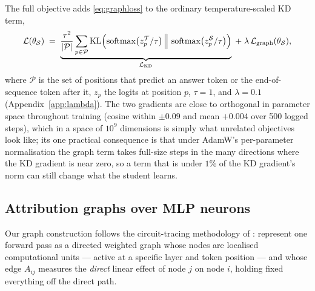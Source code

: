 \documentclass{article}
\DeclareMathOperator{\KL}{KL}
\DeclareMathOperator{\softmax}{softmax}
\newcommand{\Teach}{\mathcal{T}}
\newcommand{\Stud}{\mathcal{S}}
\begin{document}
The full objective adds \eqref{eq:graphloss} to the ordinary temperature-scaled KD term,
\begin{equation}
  \mathcal{L}(\theta_\Stud)
  \;=\;
  \underbrace{\frac{\tau^2}{|\mathcal{P}|}\sum_{p \in \mathcal{P}}
    \KL\Bigl(\softmax\bigl(z^{\Teach}_p/\tau\bigr) \,\Big\|\, \softmax\bigl(z^{\Stud}_p/\tau\bigr)\Bigr)}_{\mathcal{L}_{\mathrm{KD}}}
  \;+\;
  \lambda\, \mathcal{L}_{\mathrm{graph}}(\theta_\Stud),
  \label{eq:total}
\end{equation}
where $\mathcal{P}$ is the set of positions that predict an answer token or the end-of-sequence
token after it, $z_p$ the logits at position $p$, $\tau = 1$, and $\lambda = 0.1$
(Appendix~\ref{app:lambda}). The two gradients are close to orthogonal in parameter space
throughout training (cosine within $\pm 0.09$ and mean $+0.004$ over 500 logged steps), which in a
space of $10^9$ dimensions is simply what unrelated objectives look like; its one practical
consequence is that under AdamW's per-parameter normalisation the graph term takes full-size steps
in the many directions where the KD gradient is near zero, so a term that is under $1\%$ of the KD
gradient's norm can still change what the student learns.

\subsection{Attribution graphs over MLP neurons}
\label{sec:attrib}

Our graph construction follows the circuit-tracing methodology of
\citet{ameisen2025circuit,lindsey2025biology}: represent one forward pass as a directed weighted
graph whose nodes are localised computational units --- active at a specific layer and token
position --- and whose edge $A_{ij}$ measures the \emph{direct} linear effect of node $j$ on node
$i$, holding fixed everything off the direct path.
\end{document}
